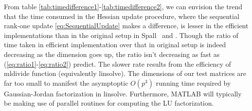 \documentclass[conference,10.6cpt]{IEEEtran}
\begin{document}
\begin{table}[htbp]
	\centering
		\caption{Time Consumed in Hessian Update Procedure for Different Dimension  $p$
			}
		\label{tab:timedifference1}
	\end{table}
	
	\begin{table}[htbp]
		\centering
			\caption{Time Consumed in Hessian Update Procedure for Different Dimension  $p$
				}
			\label{tab:timedifference2}
		\end{table}

From table \ref{tab:timedifference1}-\ref{tab:timedifference2}, we can envision the trend that the time consumed in the Hessian update procedure, where the sequential rank-one update \ref{eq:SequentialUpdate} makes a difference, is lesser in the efficient implementations than in the original setup in Spall~\cite{Spall2000} and \cite{Spall2009}. Though the ratio of time taken in efficient implementation over that in original setup is indeed decreasing as the dimension goes up, the ratio isn't decreasing as fast as (\ref{eq:ratio1}-\ref{eq:ratio2}) predict. The slower rate results from the efficiency of mldivide function (equivalently linsolve). The dimensions of our test matrices are far too small to manifest the asymptoptic $O(p^3)$ running time required by Gaussian-Jordan factorization in linsolve. Furthermore, MATLAB will typically be making use of parallel routines for computing the LU factorization. 
\end{document}

